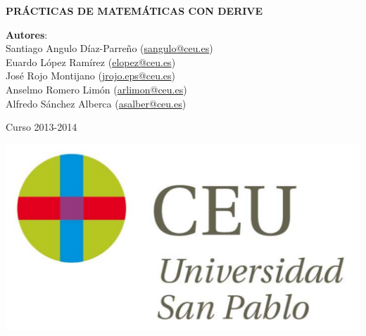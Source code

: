 \documentclass[a4paper,dvips,openright,twoside]{report}
\theoremstyle{plain}
\theoremstyle{plain}
\newcommand{\resetcounters}{\setcounter{page}{1} \setcounter{section}{0} \setcounter{footnote}{0} \setcounter{figure}{0} \setcounter{table}{0}}
\begin{document}
\begin{titlepage}
\vspace*{5cm}
\begin{center}
{\huge \bf PRÁCTICAS DE MATEMÁTICAS CON DERIVE\par}
\vspace{0.5cm}
{\large \noindent \textbf{Autores}: \\
Santiago Angulo Díaz-Parreño (\url{sangulo@ceu.es})\\
Euardo López Ramírez (\url{elopez@ceu.es})\\
José Rojo Montijano (\url{jrojo.eps@ceu.es})\\
Anselmo Romero Limón (\url{arlimon@ceu.es})\\
Alfredo Sánchez Alberca (\url{asalber@ceu.es})
}

\vspace{0.5cm}
{\large Curso 2013-2014}

\vspace{1cm}
 \includegraphics[scale=0.3]{img/logo_uspceu_01}
\end{center}
\end{titlepage}



\tableofcontents
\newpage

\resetcounters
 





%

%
%

% 
\end{document}
